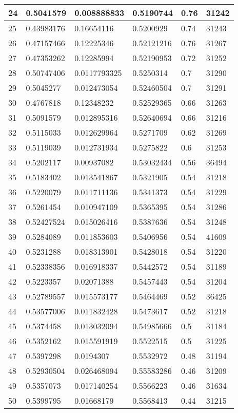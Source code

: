 \begin{longtable}{|l|l|l|l|l|l|}
24 & 0.5041579 & 0.008888833 & 0.5190744 & 0.76 & 31242 \\ \hline 
25 & 0.43983176 & 0.16654116 & 0.5200929 & 0.74 & 31243 \\ \hline 
26 & 0.47157466 & 0.12225346 & 0.52121216 & 0.76 & 31267 \\ \hline 
27 & 0.47353262 & 0.12285994 & 0.52190953 & 0.72 & 31252 \\ \hline 
28 & 0.50747406 & 0.0117793325 & 0.5250314 & 0.7 & 31290 \\ \hline 
29 & 0.5045277 & 0.012473054 & 0.52460504 & 0.7 & 31291 \\ \hline 
30 & 0.4767818 & 0.12348232 & 0.52529365 & 0.66 & 31263 \\ \hline 
31 & 0.5091579 & 0.012895316 & 0.52640694 & 0.66 & 31216 \\ \hline 
32 & 0.5115033 & 0.012629964 & 0.5271709 & 0.62 & 31269 \\ \hline 
33 & 0.5119039 & 0.012731934 & 0.5275822 & 0.6 & 31253 \\ \hline 
34 & 0.5202117 & 0.00937082 & 0.53032434 & 0.56 & 36494 \\ \hline 
35 & 0.5183402 & 0.013541867 & 0.5321905 & 0.54 & 31218 \\ \hline 
36 & 0.5220079 & 0.011711136 & 0.5341373 & 0.54 & 31229 \\ \hline 
37 & 0.5261454 & 0.010947109 & 0.5365395 & 0.54 & 31286 \\ \hline 
38 & 0.52427524 & 0.015026416 & 0.5387636 & 0.54 & 31248 \\ \hline 
39 & 0.5284089 & 0.011853603 & 0.5406956 & 0.54 & 41609 \\ \hline 
40 & 0.5231288 & 0.018313901 & 0.5428018 & 0.54 & 31220 \\ \hline 
41 & 0.52338356 & 0.016918337 & 0.5442572 & 0.54 & 31189 \\ \hline 
42 & 0.5223357 & 0.02071388 & 0.5457443 & 0.54 & 31204 \\ \hline 
43 & 0.52789557 & 0.015573177 & 0.5464469 & 0.52 & 36425 \\ \hline 
44 & 0.53577006 & 0.011832428 & 0.5473617 & 0.52 & 31218 \\ \hline 
45 & 0.5374458 & 0.013032094 & 0.54985666 & 0.5 & 31184 \\ \hline 
46 & 0.5352162 & 0.015591919 & 0.5522515 & 0.5 & 31225 \\ \hline 
47 & 0.5397298 & 0.0194307 & 0.5532972 & 0.48 & 31194 \\ \hline 
48 & 0.52930504 & 0.026468094 & 0.55583286 & 0.46 & 31209 \\ \hline 
49 & 0.5357073 & 0.017140254 & 0.5566223 & 0.46 & 31634 \\ \hline 
50 & 0.5399795 & 0.01668179 & 0.5568413 & 0.44 & 31215 \\ \hline 
\end{longtable}